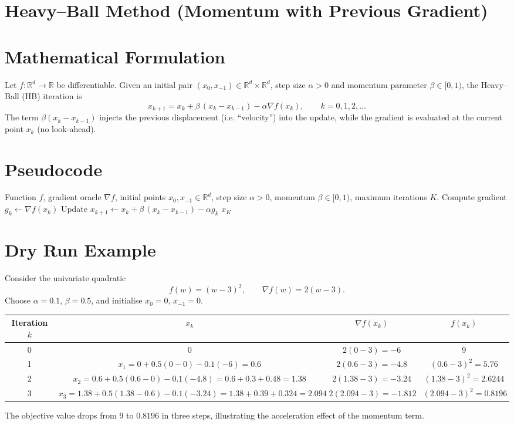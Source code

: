 \documentclass{article}
\begin{document}
\section*{Heavy–Ball Method (Momentum with Previous Gradient)}

\section*{Mathematical Formulation}
Let $f:\mathbb{R}^{d}\rightarrow\mathbb{R}$ be differentiable.  
Given an initial pair $(x_{0},x_{-1})\in\mathbb{R}^{d}\times\mathbb{R}^{d}$, step size $\alpha>0$ and momentum parameter $\beta\in[0,1)$, the Heavy–Ball (HB) iteration is
\[
\boxed{
x_{k+1}=x_{k}+\beta\,(x_{k}-x_{k-1})-\alpha\nabla f(x_{k}),\qquad k=0,1,2,\dots
}
\tag{HB}
\]
The term $\beta(x_{k}-x_{k-1})$ injects the previous displacement (i.e. “velocity”) into the update, while the gradient is evaluated at the current point $x_{k}$ (no look‑ahead).

\section*{Pseudocode}
\begin{algorithm}[H]
\caption{Heavy–Ball Method}
\begin{algorithmic}[1]
\REQUIRE Function $f$, gradient oracle $\nabla f$, initial points $x_{0},x_{-1}\in\mathbb{R}^{d}$, step size $\alpha>0$, momentum $\beta\in[0,1)$, maximum iterations $K$.
    \STATE Compute gradient $g_{k}\gets\nabla f(x_{k})$
    \STATE Update $x_{k+1}\gets x_{k}+\beta\,(x_{k}-x_{k-1})-\alpha g_{k}$
\ENDFOR
\RETURN $x_{K}$
\end{algorithmic}
\end{algorithm}

\section*{Dry Run Example}
Consider the univariate quadratic
\[
f(w)=(w-3)^{2},\qquad \nabla f(w)=2(w-3).
\]
Choose $\alpha=0.1$, $\beta=0.5$, and initialise $x_{0}=0$, $x_{-1}=0$.

\begin{center}
\begin{tabular}{c|c|c|c}
Iteration $k$ & $x_{k}$ & $\nabla f(x_{k})$ & $f(x_{k})$\\ \hline
0 & $0$ & $2(0-3)=-6$ & $9$\\
1 & $x_{1}=0+0.5(0-0)-0.1(-6)=0.6$ & $2(0.6-3)=-4.8$ & $(0.6-3)^{2}=5.76$\\
2 & $x_{2}=0.6+0.5(0.6-0)-0.1(-4.8)=0.6+0.3+0.48=1.38$ &
$2(1.38-3)=-3.24$ & $(1.38-3)^{2}=2.6244$\\
3 & $x_{3}=1.38+0.5(1.38-0.6)-0.1(-3.24)=1.38+0.39+0.324=2.094$ &
$2(2.094-3)=-1.812$ & $(2.094-3)^{2}=0.8196$
\end{tabular}
\end{center}
The objective value drops from $9$ to $0.8196$ in three steps, illustrating the acceleration effect of the momentum term.
\end{document}
